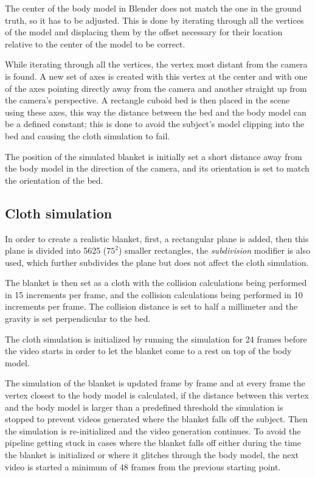 \documentclass[conference]{IEEEtran}
\begin{document}
The center of the body model in Blender does not match the one in the ground truth, so it has to be adjusted. This is done by iterating through all the vertices of the model and displacing them by the offset necessary for their location relative to the center of the model to be correct.

While iterating through all the vertices, the vertex most distant from the camera is found. A new set of axes is created with this vertex at the center and with one of the axes pointing directly away from the camera and another straight up from the camera's perspective. A rectangle cuboid bed is then placed in the scene using these axes, this way the distance between the bed and the body model can be a defined constant; this is done to avoid the subject's model clipping into the bed and causing the cloth simulation to fail.

The position of the simulated blanket is initially set a short distance away from the body model in the direction of the camera, and its orientation is set to match the orientation of the bed.


\subsection{Cloth simulation}
In order to create a realistic blanket, first, a rectangular plane is added, then this plane is divided into 5625 (\(75^2\)) smaller rectangles, the \textit{subdivision} modifier is also used, which further subdivides the plane but does not affect the cloth simulation. 

The blanket is then set as a cloth with the collision calculations being performed in 15 increments per frame, and the collision calculations being performed in 10 increments per frame. The collision distance is set to half a millimeter and the gravity is set perpendicular to the bed.

The cloth simulation is initialized by running the simulation for 24 frames before the video starts in order to let the blanket come to a rest on top of the body model.

The simulation of the blanket is updated frame by frame and at every frame the vertex closest to the body model is calculated, if the distance between this vertex and the body model is larger than a predefined threshold the simulation is stopped to prevent videos generated where the blanket falls off the subject. Then the simulation is re-initialized and the video generation continues. To avoid the pipeline getting stuck in cases where the blanket falls off either during the time the blanket is
initialized or where it glitches through the body model, the next video is started a minimum of 48 frames from the previous starting point.
\end{document}
